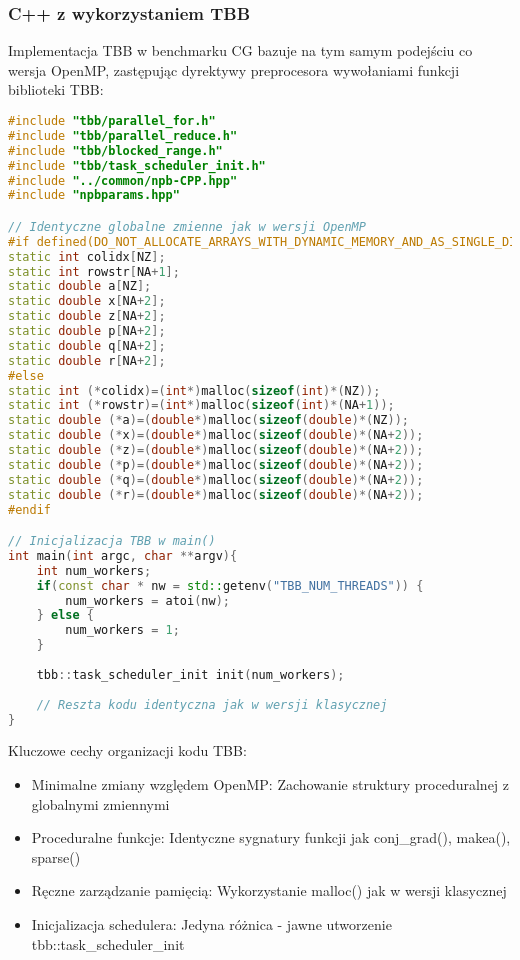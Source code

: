 \subsubsection{C++ z wykorzystaniem TBB}
Implementacja TBB w benchmarku CG bazuje na tym samym podejściu co wersja OpenMP, zastępując dyrektywy preprocesora wywołaniami funkcji biblioteki TBB:
\begin{lstlisting}[language=C++, caption={Struktura benchmarku CG w C++ z TBB}, label={lst:cg_tbb_structure}]
#include "tbb/parallel_for.h"
#include "tbb/parallel_reduce.h"
#include "tbb/blocked_range.h"
#include "tbb/task_scheduler_init.h"
#include "../common/npb-CPP.hpp"
#include "npbparams.hpp"

// Identyczne globalne zmienne jak w wersji OpenMP
#if defined(DO_NOT_ALLOCATE_ARRAYS_WITH_DYNAMIC_MEMORY_AND_AS_SINGLE_DIMENSION)
static int colidx[NZ];
static int rowstr[NA+1];
static double a[NZ];
static double x[NA+2];
static double z[NA+2];
static double p[NA+2];
static double q[NA+2];
static double r[NA+2];
#else
static int (*colidx)=(int*)malloc(sizeof(int)*(NZ));
static int (*rowstr)=(int*)malloc(sizeof(int)*(NA+1));
static double (*a)=(double*)malloc(sizeof(double)*(NZ));
static double (*x)=(double*)malloc(sizeof(double)*(NA+2));
static double (*z)=(double*)malloc(sizeof(double)*(NA+2));
static double (*p)=(double*)malloc(sizeof(double)*(NA+2));
static double (*q)=(double*)malloc(sizeof(double)*(NA+2));
static double (*r)=(double*)malloc(sizeof(double)*(NA+2));
#endif

// Inicjalizacja TBB w main()
int main(int argc, char **argv){
    int num_workers;
    if(const char * nw = std::getenv("TBB_NUM_THREADS")) {
        num_workers = atoi(nw);
    } else {
        num_workers = 1;
    }
    
    tbb::task_scheduler_init init(num_workers);
    
    // Reszta kodu identyczna jak w wersji klasycznej
}
\end{lstlisting}
Kluczowe cechy organizacji kodu TBB:
\begin{itemize}
    \item Minimalne zmiany względem OpenMP: Zachowanie struktury proceduralnej z globalnymi zmiennymi
    \item Proceduralne funkcje: Identyczne sygnatury funkcji jak conj\_grad(), makea(), sparse()
    \item Ręczne zarządzanie pamięcią: Wykorzystanie malloc() jak w wersji klasycznej
    \item Inicjalizacja schedulera: Jedyna różnica - jawne utworzenie tbb::task\_scheduler\_init
\end{itemize}


